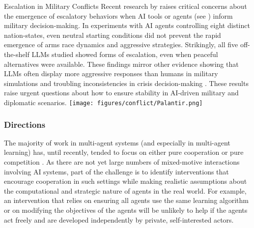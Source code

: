 \begin{case-study}[label=cs:military_escalation,sidebyside,sidebyside align=top,lower separated=false]{Escalation in Military Conflicts}
  Recent research by \citet{Rivera_2024} raises critical concerns about the emergence of escalatory behaviors when AI tools or agents (see ) inform military decision-making.
  In experiments with AI agents controlling eight distinct nation-states, even neutral starting conditions did not prevent the rapid emergence of arms race dynamics and aggressive strategies. 
  Strikingly, all five off-the-shelf LLMs studied showed forms of escalation, even when peaceful alternatives were available.
  These findings mirror other evidence showing that LLMs often display more aggressive responses than humans in military simulations and troubling inconsistencies in crisis decision-making \citep{lamparth2024humanvsmachinebehavioral, shrivastava2024measuringfreeformdecisionmakinginconsistency}.
  These results raise urgent questions about how to ensure stability in AI-driven military and diplomatic scenarios.
  \tcblower
  \texttt{[image: figures/conflict/Palantir.png]}
  \label{fig:palantir}
\end{case-study}






\subsubsection{Directions} 

The majority of work in multi-agent systems (and especially in multi-agent learning) has, until recently, tended to focus on either pure cooperation \citep[e.g.,][]{boutilier1996planning,Peshkin2000,Stone2010,Omidshafiei2017,Rashid2018,Oroojlooy2022} or pure competition \citep[e.g.,][]{Silver2016, Zhang2020,Daskalakis2011,Brown2019a,Bakhtin2022,NEURIPS2020_3b2acfe2}.
As there are not yet large numbers of mixed-motive interactions involving AI systems, part of the challenge is to identify interventions that encourage cooperation in such settings while making realistic assumptions about the computational and strategic nature of agents in the real world.
For example, an intervention that relies on ensuring all agents use the same learning algorithm or on modifying the objectives of the agents will be unlikely to help if the agents act freely and are developed independently by private, self-interested actors.

